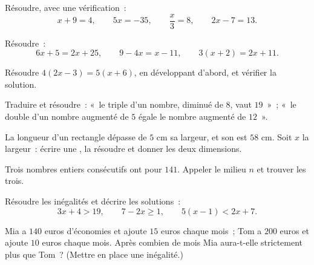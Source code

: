 \begin{exercise}[$\star$]\label{exo:g8:equations:4}
Résoudre, avec une vérification~:
\[
x + 9 = 4, \qquad
5x = -35, \qquad
\frac{x}{3} = 8, \qquad
2x - 7 = 13 .
\]
\end{exercise}

\begin{exercise}[$\star$]\label{exo:g8:equations:5}
Résoudre~:
\[
6x + 5 = 2x + 25, \qquad
9 - 4x = x - 11, \qquad
3(x + 2) = 2x + 11 .
\]
\end{exercise}

\begin{exercise}[$\star$]\label{exo:g8:equations:6}
Résoudre $4(2x - 3) = 5(x + 6)$, en développant d'abord, et vérifier
la solution.
\end{exercise}

\begin{exercise}[$\star$]\label{exo:g8:equations:7}
Traduire et résoudre~: «~le triple d'un nombre, diminué de $8$, vaut
$19$~»~; «~le double d'un nombre augmenté de $5$ égale le nombre
augmenté de $12$~».
\end{exercise}

\begin{exercise}[$\star\star$]\label{exo:g8:equations:8}
La longueur d'un rectangle dépasse de $5$ cm sa largeur, et son
 est $58$ cm. Soit $x$ la largeur~: écrire une , la
résoudre et donner les deux dimensions.
\end{exercise}

\begin{exercise}[$\star\star$]\label{exo:g8:equations:9}
Trois nombres entiers consécutifs ont pour  $141$. Appeler le
milieu $n$ et trouver les trois.
\end{exercise}

\begin{exercise}[$\star\star$]\label{exo:g8:equations:10}
Résoudre les inégalités et décrire les solutions~:
\[
3x + 4 > 19, \qquad
7 - 2x \geq 1, \qquad
5(x - 1) < 2x + 7 .
\]
\end{exercise}

\begin{exercise}[$\star\star$]\label{exo:g8:equations:11}
Mia a $140$ euros d'économies et ajoute $15$ euros chaque mois~; Tom
a $200$ euros et ajoute $10$ euros chaque mois. Après combien de mois
Mia aura-t-elle strictement plus que Tom~? (Mettre en place une
inégalité.)
\end{exercise}

